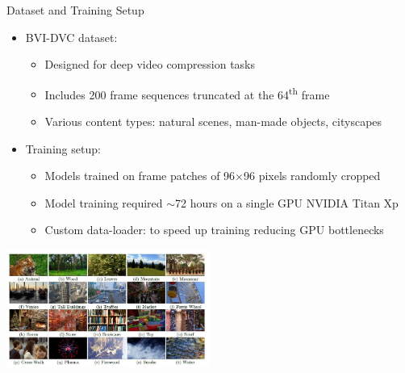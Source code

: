 \documentclass{beamer}
\begin{document}
\begin{frame}{Dataset and Training Setup}
\begin{itemize}
  \item BVI-DVC dataset:
  \begin{itemize}
    \item Designed for deep video compression tasks
    \item Includes 200 frame sequences truncated at the 64\textsuperscript{th} frame
    \item Various content types: natural scenes, man-made objects, cityscapes
  \end{itemize}
  \item Training setup:
  \begin{itemize}
    \item Models trained on frame patches of 96$\times$96 pixels randomly cropped
    \item Model training required $\sim$72 hours on a single GPU NVIDIA Titan Xp
    \item Custom data-loader: to speed up training reducing GPU bottlenecks
  \end{itemize}
\end{itemize}

\centering
\includegraphics[width=0.5\textwidth]{../thesis/static/BVI-DVC.jpg}

\end{frame}
\end{document}
